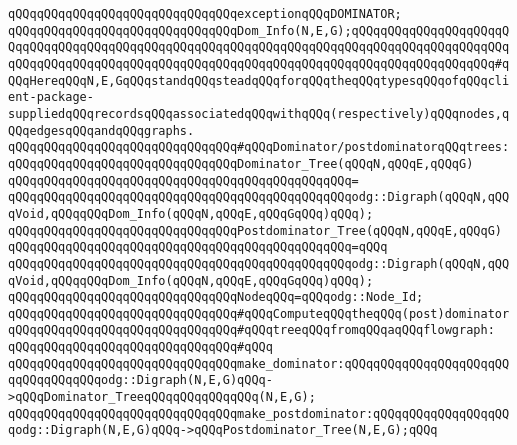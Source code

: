 \newline
\verb|qQQqqQQqqQQqqQQqqQQqqQQqqQQqqQQqexceptionqQQqDOMINATOR;|\newline
\newline
\verb|qQQqqQQqqQQqqQQqqQQqqQQqqQQqqQQqDom_Info(N,E,G);qQQqqQQqqQQqqQQqqQQqqQQqqQQqqQQqqQQqqQQqqQQqqQQqqQQqqQQqqQQqqQQqqQQqqQQqqQQqqQQqqQQqqQQqqQQqqQQqqQQqqQQqqQQqqQQqqQQqqQQqqQQqqQQqqQQqqQQqqQQqqQQqqQQqqQQqqQQqqQQq#qQQqHereqQQqN,E,GqQQqstandqQQqsteadqQQqforqQQqtheqQQqtypesqQQqofqQQqclient-package-suppliedqQQqrecordsqQQqassociatedqQQqwithqQQq(respectively)qQQqnodes,qQQqedgesqQQqandqQQqgraphs.|\newline
\newline
\verb|qQQqqQQqqQQqqQQqqQQqqQQqqQQqqQQq#qQQqDominator/postdominatorqQQqtrees:|\newline
\newline
\verb|qQQqqQQqqQQqqQQqqQQqqQQqqQQqqQQqDominator_Tree(qQQqN,qQQqE,qQQqG)|\newline
\verb|qQQqqQQqqQQqqQQqqQQqqQQqqQQqqQQqqQQqqQQqqQQqqQQq=|\newline
\verb|qQQqqQQqqQQqqQQqqQQqqQQqqQQqqQQqqQQqqQQqqQQqqQQqodg::Digraph(qQQqN,qQQqVoid,qQQqqQQqDom_Info(qQQqN,qQQqE,qQQqGqQQq)qQQq);|\newline
\newline
\verb|qQQqqQQqqQQqqQQqqQQqqQQqqQQqqQQqPostdominator_Tree(qQQqN,qQQqE,qQQqG)|\newline
\verb|qQQqqQQqqQQqqQQqqQQqqQQqqQQqqQQqqQQqqQQqqQQqqQQq=qQQq|\newline
\verb|qQQqqQQqqQQqqQQqqQQqqQQqqQQqqQQqqQQqqQQqqQQqqQQqodg::Digraph(qQQqN,qQQqVoid,qQQqqQQqDom_Info(qQQqN,qQQqE,qQQqGqQQq)qQQq);|\newline
\newline
\verb|qQQqqQQqqQQqqQQqqQQqqQQqqQQqqQQqNodeqQQq=qQQqodg::Node_Id;|\newline
\newline
\verb|qQQqqQQqqQQqqQQqqQQqqQQqqQQqqQQq#qQQqComputeqQQqtheqQQq(post)dominator|\newline
\verb|qQQqqQQqqQQqqQQqqQQqqQQqqQQqqQQq#qQQqtreeqQQqfromqQQqaqQQqflowgraph:|\newline
\verb|qQQqqQQqqQQqqQQqqQQqqQQqqQQqqQQq#qQQq|\newline
\verb|qQQqqQQqqQQqqQQqqQQqqQQqqQQqqQQqmake_dominator:qQQqqQQqqQQqqQQqqQQqqQQqqQQqqQQqqQQqodg::Digraph(N,E,G)qQQq->qQQqDominator_TreeqQQqqQQqqQQqqQQq(N,E,G);|\newline
\verb|qQQqqQQqqQQqqQQqqQQqqQQqqQQqqQQqmake_postdominator:qQQqqQQqqQQqqQQqqQQqodg::Digraph(N,E,G)qQQq->qQQqPostdominator_Tree(N,E,G);qQQq|\newline
